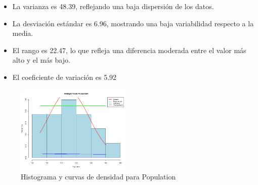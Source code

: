 \documentclass{article}
\begin{document}
\begin{itemize}
\begin{itemize}
\begin{itemize}
                \item La varianza es 48.39, reflejando una baja dispersión de los datos.
                \item La desviación estándar es 6.96, mostrando una baja variabilidad respecto a la media.
                \item El rango es 22.47, lo que refleja una diferencia moderada entre el valor más alto y el más bajo.
                \item El coeficiente de variación es 5.92%
            \end{itemize}
    \end{itemize}
    
    \begin{figure}[H]
        \centering
        \includegraphics[width=0.5\textwidth]{HistogramasDensidad/histograma_Population.png}
        \caption{Histograma y curvas de densidad para Population}
        \vspace{0.5cm}
    \end{figure}



\end{itemize}
\end{document}
